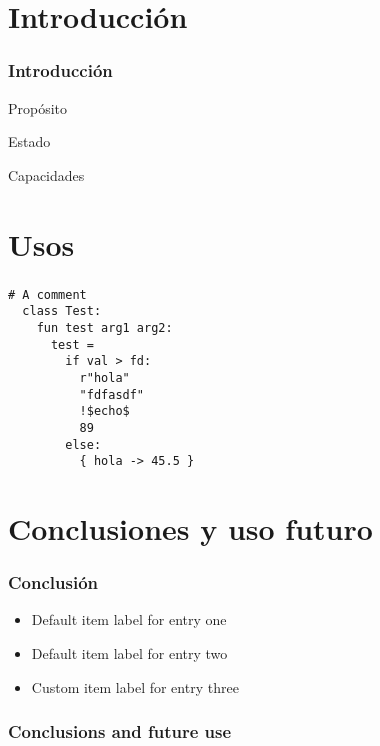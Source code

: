 \section{Introducción}
\begin{frame}
  \frametitle{Introducción}

  \begin{center}
    Propósito
  \end{center}

  \framebreak

  \begin{center}
    Estado
  \end{center}

  \begin{center}
    Capacidades
  \end{center}

\end{frame}


\section{Usos}
\begin{frame}
  \frametitle{}

  \begin{lstlisting}[language=scriptflow]
  # A comment
  class Test:
    fun test arg1 arg2:
      test =
        if val > fd:
          r"hola"
          "fdfasdf"
          !$echo$
          89
        else:
          { hola -> 45.5 }
  \end{lstlisting}


\end{frame}

\section{Conclusiones y uso futuro}
\begin{frame}
  \frametitle{Conclusión}
  \begin{center}
    \renewcommand{\labelitemi}{$\blacksquare$}
    \renewcommand\labelitemii{$\square$}
    \begin{itemize}
      \item  Default item label for entry one
      \item  Default item label for entry two
      \item  Custom item label for entry three
    \end{itemize}
  \end{center}

  \frametitle{Conclusions and future use}

\end{frame}

